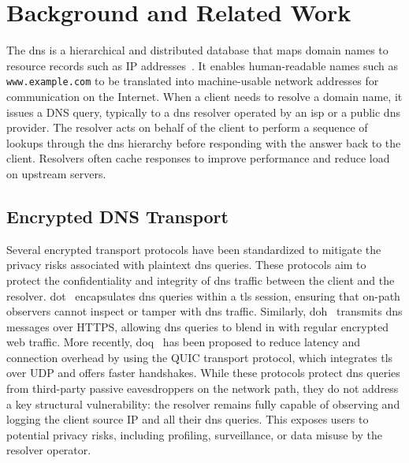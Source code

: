 \section{Background and Related Work} \label{sec:background} The \acf{dns} is a
hierarchical and distributed database that maps domain names to resource records
such as IP addresses~\cite{RFC1034,RFC1035}. It enables human-readable
names such as \texttt{www.example.com} to be translated into machine-usable
network addresses for communication on the Internet. When a client needs to
resolve a domain name, it issues a DNS query, typically to a \ac{dns} resolver
operated by an \ac{isp} or a public \ac{dns} provider. The resolver acts on
behalf of the client to perform a sequence of lookups through the \ac{dns}
hierarchy before responding with the answer back to the client. Resolvers often
cache responses to improve performance and reduce load on upstream servers. 

\subsection{Encrypted DNS Transport} \label{sec:bg:encr} Several encrypted
transport protocols have been standardized to mitigate the privacy risks
associated with plaintext \ac{dns} queries. These protocols aim to protect the
confidentiality and integrity of \ac{dns} traffic between the client and the
resolver. \acf{dot}~\cite{RFC7858} encapsulates \ac{dns} queries within a
\ac{tls} session, ensuring that on-path observers cannot inspect or tamper with
\ac{dns} traffic. Similarly, \acf{doh}~\cite{RFC8484} transmits \ac{dns}
messages over HTTPS, allowing \ac{dns} queries to blend in with regular
encrypted web traffic. More recently, \acf{doq}~\cite{RFC9250} has been
proposed to reduce latency and connection overhead by using the QUIC transport
protocol, which integrates \ac{tls} over UDP and offers faster handshakes.
While these protocols protect \ac{dns} queries from third-party passive
eavesdroppers on the network path, they do not address a key structural
vulnerability: the resolver remains fully capable of observing and logging the
client source IP and all their \ac{dns} queries. This exposes users to
potential privacy risks, including profiling, surveillance, or data misuse by
the resolver operator.

